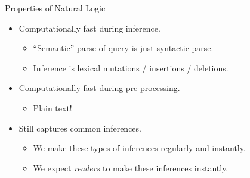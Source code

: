 \begin{frame}{Properties of Natural Logic}
\begin{itemize}
  \item[\darkgreen{\checkmark}] Computationally fast during inference.
  \begin{itemize}
    \item ``Semantic'' parse of query is just syntactic parse.
    \item Inference is lexical mutations / insertions / deletions.
  \end{itemize}
  \vspace{0.5cm}
  \pause

  \item[\darkgreen{\checkmark}] Computationally fast during pre-processing.
  \begin{itemize}
    \item Plain text!
  \end{itemize}
  \vspace{0.5cm}
  \pause

  \item[\darkgreen{\checkmark}] Still captures common inferences.
  \begin{itemize}
    \item We make these types of inferences regularly and instantly.
    \pause
    \item We expect \textit{readers} to make these inferences instantly.
  \end{itemize}
\end{itemize}
\end{frame}
